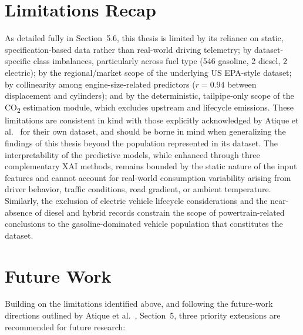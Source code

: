 \section{Limitations Recap}

As detailed fully in Section~5.6, this thesis is limited by its reliance on static, specification-based data rather than real-world driving telemetry; by dataset-specific class imbalances, particularly across fuel type (546 gasoline, 2 diesel, 2 electric); by the regional/market scope of the underlying US EPA-style dataset; by collinearity among engine-size-related predictors (\(r = 0.94\) between displacement and cylinders); and by the deterministic, tailpipe-only scope of the CO\textsubscript{2} estimation module, which excludes upstream and lifecycle emissions. These limitations are consistent in kind with those explicitly acknowledged by Atique et al.~\cite{atique2026explainable} for their own dataset, and should be borne in mind when generalizing the findings of this thesis beyond the population represented in its dataset. The interpretability of the predictive models, while enhanced through three complementary XAI methods, remains bounded by the static nature of the input features and cannot account for real-world consumption variability arising from driver behavior, traffic conditions, road gradient, or ambient temperature. Similarly, the exclusion of electric vehicle lifecycle considerations and the near-absence of diesel and hybrid records constrain the scope of powertrain-related conclusions to the gasoline-dominated vehicle population that constitutes the dataset.


\section{Future Work}

Building on the limitations identified above, and following the future-work directions outlined by Atique et al.~\cite{atique2026explainable}, Section~5, three priority extensions are recommended for future research:

